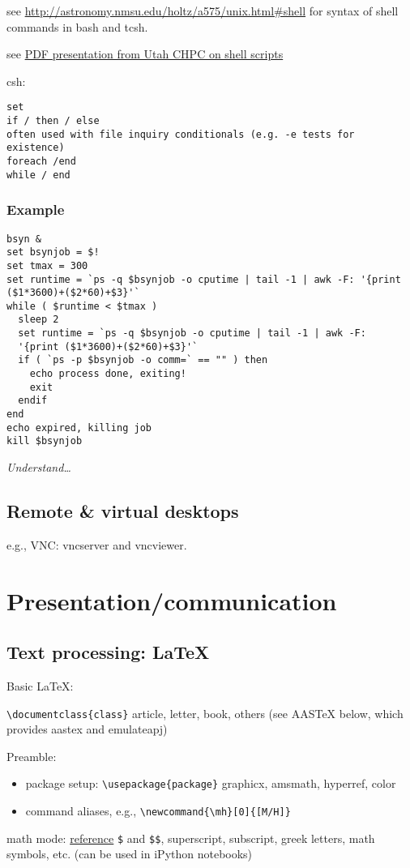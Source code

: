 \documentclass{article}
\newcommand{\test}[1]{%
    \begin{center}
        \colorbox{hl}{\parbox{0.9\textwidth}{\emph{#1}}}
    \end{center}}
\begin{document}
see \url{http://astronomy.nmsu.edu/holtz/a575/unix.html#shell}
for syntax of shell commands in bash and tcsh.

see
\href{http://astronomy.nmsu.edu/holtz/a575/IntroScriptingJuly2015.pdf}
{PDF presentation from Utah CHPC on shell scripts}

csh:
\begin{verbatim}
set
if / then / else
often used with file inquiry conditionals (e.g. -e tests for
existence)
foreach /end
while / end
\end{verbatim}


\subsubsection{Example}

\begin{verbatim}
bsyn &
set bsynjob = $!
set tmax = 300
set runtime = `ps -q $bsynjob -o cputime | tail -1 | awk -F: '{print ($1*3600)+($2*60)+$3}'`
while ( $runtime < $tmax )
  sleep 2
  set runtime = `ps -q $bsynjob -o cputime | tail -1 | awk -F:
  '{print ($1*3600)+($2*60)+$3}'`
  if ( `ps -p $bsynjob -o comm=` == "" ) then
    echo process done, exiting!
    exit
  endif
end
echo expired, killing job
kill $bsynjob
\end{verbatim}

\test{Understand\ldots}

\subsection{Remote \& virtual desktops}
e.g., VNC: vncserver and vncviewer.

\section{Presentation/communication}
\subsection{Text processing: LaTeX}

Basic LaTeX:

\verb|\documentclass{class}| article, letter, book, others (see AASTeX
below, which provides aastex and emulateapj)

Preamble:
\begin{itemize}
    \item package setup: \verb|\usepackage{package}|
        graphicx, amsmath, hyperref, color
    \item command aliases, e.g., \verb|\newcommand{\mh}[0]{[M/H]}|
\end{itemize}
math mode:
\href{https://www.sharelatex.com/learn/Mathematical_expressions}{reference}
\verb|$| and \verb|$$|, superscript, subscript, greek
letters, math symbols, etc. (can be used in iPython notebooks)
\end{document}
